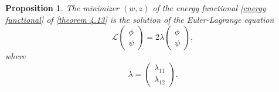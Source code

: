 \documentclass[11pt]{amsart}
\numberwithin{equation}{section}
\theoremstyle{plain}
\newtheorem{proposition}[theorem]{Proposition}
\theoremstyle{definition}
\begin{document}
\begin{proposition}
	The minimizer $(w,z)$ of the energy functional \cref{energy functional} of \cref{theorem 4.13} is the solution of the Euler-Lagrange equation
	\begin{equation*}
		\mathcal{L}\begin{pmatrix}
			\phi\\
			\psi
		\end{pmatrix}=2\lambda \begin{pmatrix}
			\phi\\
			\psi
		\end{pmatrix},
	\end{equation*}
	where
	\begin{equation*} \label{euler lagrange}
		\lambda = \begin{pmatrix}
			\lambda_{11}\\
			\lambda_{12}
		\end{pmatrix}.
	\end{equation*}
\end{proposition}
\end{document}
